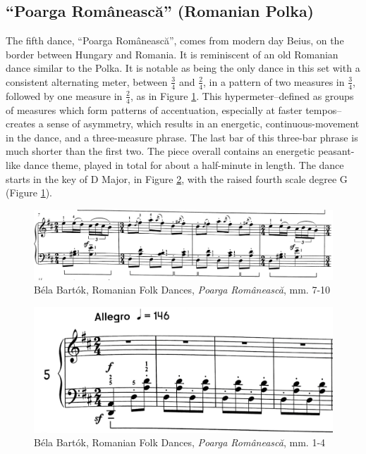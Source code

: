 \subsection{``Poarga Românească'' (Romanian Polka)}

The fifth dance, ``Poarga Românească'', comes from modern day Beius, on the border between Hungary and Romania. It is reminiscent of an old Romanian dance similar to the Polka. It is notable as being the only dance in this set with a consistent alternating meter, between $\frac{3}{4}$ and $\frac{2}{4}$, in a pattern of two measures in $\frac{3}{4}$, followed by one measure in $\frac{2}{4}$, as in Figure \ref{fig:bartok-dance-five-time-signature}\autocite{Lung_2016}. This hypermeter\autocite{Hughes_Gotham_Hamm_2021}--defined as groups of measures which form patterns of accentuation, especially at faster tempos--creates a sense of asymmetry, which results in an energetic, continuous-movement in the dance, and a three-measure phrase. The last bar of this three-bar phrase is much shorter than the first two. The piece overall contains an energetic peasant-like dance theme, played in total for about a half-minute in length. The dance starts in the key of D Major, in Figure \ref{fig:bartok-dance-five-first-four-bars}\autocite{Lung_2016}, with the raised fourth scale degree G\musSharp{} (Figure \ref{fig:bartok-dance-five-time-signature}\autocite{Lung_2016}).

\begin{figure}[h]
  \centering
  \includegraphics[width=\textwidth]{figures/bartok-dance-five-time-signature.jpg}
  \caption{Béla Bartók, Romanian Folk Dances, \textit{Poarga Românească}, mm. 7-10}
  \label{fig:bartok-dance-five-time-signature}
\end{figure}

\begin{figure}[h]
  \centering
  \includegraphics[width=\textwidth]{figures/bartok-dance-five-first-four-bars.jpg}
  \caption{Béla Bartók, Romanian Folk Dances, \textit{Poarga Românească}, mm. 1-4}
  \label{fig:bartok-dance-five-first-four-bars}
\end{figure}

